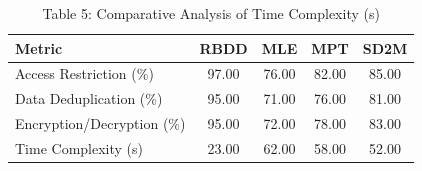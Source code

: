 \begin{table}[h!]
\centering
\caption{Table 5: Comparative Analysis of Time Complexity (s)}
\begin{tabular}{|l|c|c|c|c|}
\hline
Metric & RBDD & MLE & MPT & SD2M \\
\hline
Access Restriction (\%) & 97.00 & 76.00 & 82.00 & 85.00 \\
Data Deduplication (\%) & 95.00 & 71.00 & 76.00 & 81.00 \\
Encryption/Decryption (\%) & 95.00 & 72.00 & 78.00 & 83.00 \\
Time Complexity (s) & 23.00 & 62.00 & 58.00 & 52.00 \\
\hline
\end{tabular}
\end{table}